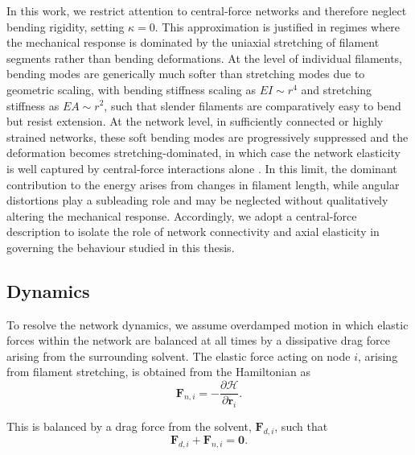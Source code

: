 \documentclass[asymmetricmargins]{library/duthesis}%
\begin{document}
In this work, we restrict attention to central-force networks and therefore neglect bending rigidity, setting $\kappa = 0$. This approximation is justified in regimes where the mechanical response is dominated by the uniaxial stretching of filament segments rather than bending deformations. At the level of individual filaments, bending modes are generically much softer than stretching modes due to geometric scaling, with bending stiffness scaling as $EI \sim r^4$ and stretching stiffness as $EA \sim r^2$, such that slender filaments are comparatively easy to bend but resist extension. At the network level, in sufficiently connected or highly strained networks, these soft bending modes are progressively suppressed and the deformation becomes stretching-dominated, in which case the network elasticity is well captured by central-force interactions alone \cite{mackintosh_elasticity_1995,broedersz_criticality_2011,shivers_scaling_2019}. In this limit, the dominant contribution to the energy arises from changes in filament length, while angular distortions play a subleading role and may be neglected without qualitatively altering the mechanical response. Accordingly, we adopt a central-force description to isolate the role of network connectivity and axial elasticity in governing the behaviour studied in this thesis.

\subsection{Dynamics} \label{sec:NetworkDynamics}
To resolve the network dynamics, we assume overdamped motion in which elastic forces within the network are balanced at all times by a dissipative drag force arising from the surrounding solvent. The elastic force acting on node $i$, arising from filament stretching, is obtained from the Hamiltonian as
\begin{equation}
    \bm{F}_{n,i}=-\frac{\partial \mathcal{H}}{\partial \bm{r}_i}.
\end{equation}

This is balanced by a drag force from the solvent, $\bm{F}_{d,i}$, such that
\begin{equation}
    \bm{F}_{d,i} + \bm{F}_{n,i}=\bm{0}.
    \label{eq:ForceBalance}
\end{equation}
\end{document}
